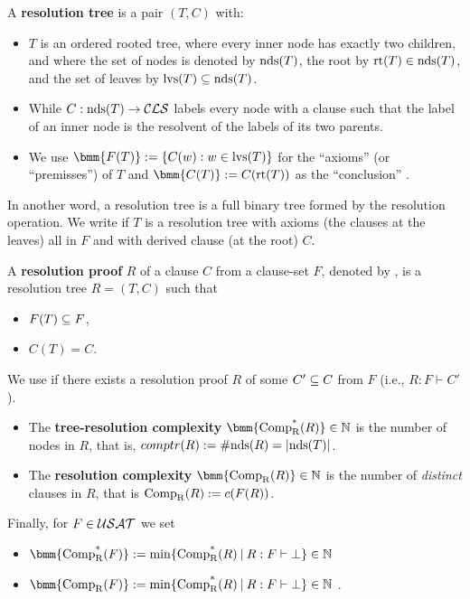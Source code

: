 \documentclass[12pt]{book}
\begin{document}
\begin{defi}\label{def:restree}
  A \textbf{resolution tree} is a pair $(T,C)$ with:
  \begin{itemize}
  \item $T$ is an ordered rooted tree, where every inner node has exactly two children, and where the set of nodes is denoted 
  by $\operatorname{nds}(T)$, the root by $\operatorname{rt}(T) \in \operatorname{nds}(T)$, and the set of leaves by $\operatorname{lvs}(T) \subseteq \operatorname{nds}(T)$.
  \item While $C: \operatorname{nds}(T) \rightarrow \mathcal{CLS}$ labels every node with a clause such that the label of an inner node is the resolvent of the labels of its two parents.
  \item We use $\bmm{F(T)} := \set{C(w) : w \in \lvs(T)}$ for the ``axioms'' (or ``premisses'') of $T$ and $\bmm{C(T)} := C(\rt(T))$ as the ``conclusion'' \cite{h5}.
  \end{itemize}
\end{defi}
In another word, a resolution tree is a full binary tree formed by the resolution operation. We write  if $T$ is a 
resolution tree with axioms (the clauses at the leaves) all in $F$ and with derived clause (at the root) $C$. 
\begin{defi}\label{def:resproof}
  A \textbf{resolution proof} $R$ of a clause $C$ from a clause-set $F$, denoted by , is a resolution tree $R = (T,C)$ such that
  \begin{itemize}
  \item $F(T) \subseteq F$,
  \item $C(T) = C$.
  \end{itemize}
  We use  if there exists a resolution proof $R$ of some $C' \subseteq C$ from $F$ (i.e., $R: F \vdash C'$). 
  \begin{itemize}
  \item The \textbf{tree-resolution complexity} $\bmm{\comptr(R)} \in \NN$ is the number of nodes in $R$, that is, $comptr(R) := \operatorname{\#nds}(R) = \lvert \operatorname{nds}(T) \rvert$.
  \item The \textbf{resolution complexity} $\bmm{\compr(R)} \in \NN$ is the number of \emph{distinct} clauses in $R$, that is $\operatorname{\operatorname{Comp}_R}(R) := c(F(R))$.
  \end{itemize}
  Finally, for $F \in \mathcal{USAT}$ we set
  \begin{itemize}
  \item $\bmm{\comptr(F)} := \min \set{\comptr(R) \mb R : F \vdash \bot} \in \NN$
  \item $\bmm{\compr(F)} := \min \set{\comptr(R) \mb R : F \vdash \bot} \in \NN$ \cite{h5}.
  \end{itemize}
\end{defi}
\end{document}
